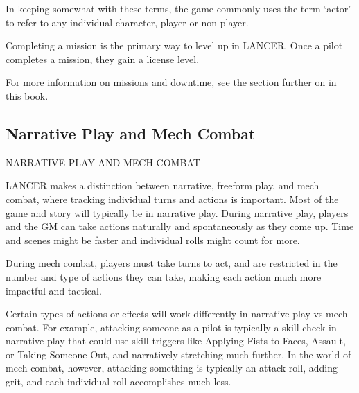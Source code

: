 In keeping somewhat with these terms, the game commonly uses the term ‘actor’ to refer to any 
individual character, player or non-player. 

                                                                                                                 


Completing a mission is the primary way to level up in LANCER. Once a pilot completes a  
mission, they gain a license level.
 

For more information on missions and downtime, see the section further on in this book.
 
 
\subsection{Narrative Play and Mech Combat}
                          NARRATIVE PLAY AND MECH COMBAT  

LANCER makes a distinction between narrative, freeform play, and mech combat, where tracking  
individual turns and actions is important. Most of the game and story will typically be in narrative  
play. During narrative play, players and the GM can take actions naturally and spontaneously as  
they come up. Time and scenes might be faster and individual rolls might count for more.
 
	        During mech combat, players must take turns to act, and are restricted in the number  
and type of actions they can take, making each action much more impactful and tactical.
 
	        Certain types of actions or effects will work differently in narrative play vs mech combat.  
For example, attacking someone as a pilot is typically a skill check in narrative play that could  
use skill triggers like Applying Fists to Faces, Assault, or Taking Someone Out, and narratively  
stretching much further. In the world of mech combat, however, attacking something is typically  
an attack roll, adding grit, and each individual roll accomplishes much less.
 

                                                                           